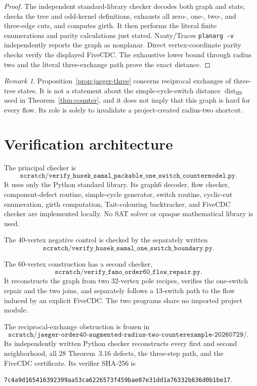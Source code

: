 \documentclass[11pt]{article}
\theoremstyle{definition}
\theoremstyle{remark}
\newtheorem{remark}[theorem]{Remark}
\newcommand{\dist}{\operatorname{dist}}
\newcommand{\HS}{\mathrm{HS}}
\numberwithin{equation}{section}
\begin{document}
\begin{proof}
The independent standard-library checker decodes both graph and state,
checks the tree and odd-kernel definitions, exhausts all zero-, one-,
two-, and three-edge cuts, and computes girth.  It then performs the
literal finite enumerations and parity calculations just stated.
Nauty/Traces \texttt{planarg -v} independently reports the graph as
nonplanar.  Direct vertex-coordinate parity checks verify the displayed
FiveCDC.  The exhaustive lower bound through radius two and the literal
three-exchange path prove the exact distance.
\end{proof}

\begin{remark}
Proposition~\ref{prop:jaeger-three} concerns reciprocal exchanges of
three-tree states.  It is not a statement about the simple-cycle-switch
distance \(\dist_{\HS}\) used in
Theorem~\ref{thm:counter}, and it does not imply that this graph is hard
for every flow.  Its role is solely to invalidate a project-created
radius-two shortcut.
\end{remark}

\section{Verification architecture}

The principal checker is
\[
\texttt{scratch/verify\_husek\_samal\_packable\_one\_switch\_countermodel.py}.
\]
It uses only the Python standard library.  Its graph6 decoder, flow
checker, component-defect routine, simple-cycle generator, switch
routine, cyclic-cut enumeration, girth computation, Tait-colouring
backtracker, and FiveCDC checker are implemented locally.  No SAT solver
or opaque mathematical library is used.

The 40-vertex negative control is checked by the separately written
\[
\texttt{scratch/verify\_husek\_samal\_one\_switch\_boundary.py}.
\]

The 60-vertex construction has a second checker,
\[
\texttt{scratch/verify\_fano\_order60\_flow\_repair.py}.
\]
It reconstructs the graph from two 32-vertex pole recipes, verifies the
one-switch repair and the two joins, and separately follows a
13-switch path to the flow induced by an explicit FiveCDC.  The two
programs share no imported project module.

The reciprocal-exchange obstruction is frozen in
\[
\texttt{scratch/jaeger-order40-augmented-radius-two-counterexample-20260729/}.
\]
Its independently written Python checker reconstructs every first and
second neighborhood, all 28 Theorem~3.16 defects, the three-step path,
and the FiveCDC certificate.  Its verifier SHA-256 is
\begin{center}
\nolinkurl{7c4a9d165416392399aa53ca6226573f459bae07e31dd1a76332b636d0b1be17}.
\end{center}
\end{document}
